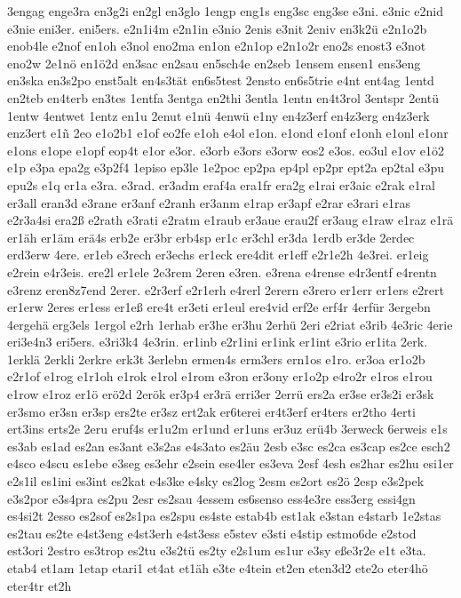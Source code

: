 {3engag
enge3ra
en3g2i
en2gl
en3glo
1engp
eng1s
eng3sc
eng3se
e3ni.
e3nic
e2nid
e3nie
eni3er.
eni5ers.
e2n1i4m
e2n1in
e3nio
2enis
e3nit
2eniv
en3k2ü
e2n1o2b
enob4le
e2nof
en1oh
e3nol
eno2ma
en1on
e2n1op
e2n1o2r
eno2s
enost3
e3not
eno2w
2e1nö
en1ö2d
en3sac
en2sau
en5sch4e
en2seb
1ensem
ensen1
ens3eng
en3ska
en3s2po
enst5alt
en4s3tät
en6s5test
2ensto
en6s5trie
e4nt
ent4ag
1entd
en2teb
en4terb
en3tes
1entfa
3entga
en2thi
3entla
1entn
en4t3rol
3entspr
2entü
1entw
4entwet
1entz
en1u
2enut
e1nü
4enwü
e1ny
en4z3erf
en4z3erg
en4z3erk
enz3ert
e1ñ
2eo
e1o2b1
e1of
eo2fe
e1oh
e4ol
e1on.
e1ond
e1onf
e1onh
e1onl
e1onr
e1ons
e1ope
e1opf
eop4t
e1or
e3or.
e3orb
e3ors
e3orw
eos2
e3os.
eo3ul
e1ov
e1ö2
e1p
e3pa
epa2g
e3p2f4
1episo
ep3le
1e2poc
ep2pa
ep4pl
ep2pr
ept2a
ep2tal
e3pu
epu2s
e1q
er1a
e3ra.
e3rad.
er3adm
eraf4a
era1fr
era2g
e1rai
er3aic
e2rak
e1ral
er3all
eran3d
e3rane
er3anf
e2ranh
er3anm
e1rap
er3apf
e2rar
e3rari
e1ras
e2r3a4si
era2ß
e2rath
e3rati
e2ratm
e1raub
er3aue
erau2f
er3aug
e1raw
e1raz
e1rä
er1äh
er1äm
erä4s
erb2e
er3br
erb4sp
er1c
er3chl
er3da
1erdb
er3de
2erdec
erd3erw
4ere.
er1eb
e3rech
er3echs
er1eck
ere4dit
er1eff
e2r1e2h
4e3rei.
er1eig
e2rein
e4r3eis.
ere2l
er1ele
2e3rem
2eren
e3ren.
e3rena
e4rense
e4r3entf
e4rentn
e3renz
eren8z7end
2erer.
e2r3erf
e2r1erh
e4rerl
2erern
e3rero
er1err
er1ers
e2rert
er1erw
2eres
er1ess
er1eß
ere4t
er3eti
er1eul
ere4vid
erf2e
erf4r
4erfür
3ergebn
4ergehä
erg3els
1ergol
e2rh
1erhab
er3he
er3hu
2erhü
2eri
e2riat
e3rib
4e3ric
4erie
eri3e4n3
eri5ers.
e3ri3k4
4e3rin.
er1inb
e2r1ini
er1ink
er1int
e3rio
er1ita
2erk.
1erklä
2erkli
2erkre
erk3t
3erlebn
ermen4s
erm3ers
ern1os
e1ro.
er3oa
er1o2b
e2r1of
e1rog
e1r1oh
e1rok
e1rol
e1rom
e3ron
er3ony
er1o2p
e4ro2r
e1ros
e1rou
e1row
e1roz
er1ö
erö2d
2erök
er3p4
er3rä
erri3er
2errü
ers2a
er3se
er3s2i
er3sk
er3smo
er3sn
er3sp
ers2te
er3sz
ert2ak
er6terei
er4t3erf
er4ters
er2tho
4erti
ert3ins
erts2e
2eru
eruf4s
er1u2m
er1und
er1uns
er3uz
erü4b
3erweck
6erweis
e1s
es3ab
es1ad
es2an
es3ant
e3s2as
e4s3ato
es2äu
2esb
e3sc
es2ca
es3cap
es2ce
esch2
e4sco
e4scu
es1ebe
e3seg
es3ehr
e2sein
ese4ler
es3eva
2esf
4esh
es2har
es2hu
esi1er
e2s1il
es1ini
es3int
es2kat
e4s3ke
e4sky
es2log
2esm
es2ort
es2ö
2esp
e3s2pek
e3s2por
e3s4pra
es2pu
2esr
es2sau
4essem
es6senso
ess4e3re
ess3erg
essi4gn
es4si2t
2esso
es2sof
es2s1pa
es2spu
es4ste
estab4b
est1ak
e3stan
e4starb
1e2stas
es2tau
es2te
e4st3eng
e4st3erh
e4st3ess
e5stev
e3sti
e4stip
estmo6de
e2stod
est3ori
2estro
es3trop
es2tu
e3s2tü
es2ty
e2s1um
es1ur
e3sy
eße3r2e
e1t
e3ta.
etab4
et1am
1etap
etari1
et4at
et1äh
e3te
e4tein
et2en
eten3d2
ete2o
eter4hö
eter4tr
et2h
}
